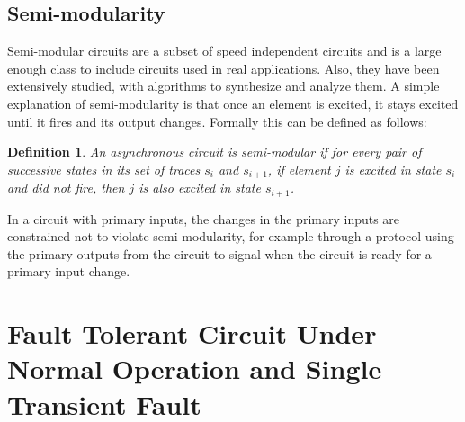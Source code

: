\documentclass[12pt]{report}
\newtheorem*{definition}{Definition}
\begin{document}
\section{Semi-modularity}
Semi-modular circuits are a subset of speed independent circuits and is a large enough class to include circuits used in real applications.  Also, they have been extensively studied, with algorithms to synthesize and analyze them.  A simple explanation of semi-modularity is that once an element is excited, it stays excited until it fires and its output changes.  Formally this can be defined as follows: %
\begin{definition}
An asynchronous circuit is {\em semi-modular} if for every pair of successive states in its set of traces $s_{i}$ and $s_{i+1}$, if element $j$ is excited in state $s_i$ and did not fire, then $j$ is also excited in state $s_{i+1}$. 
\end{definition}
In a circuit with primary inputs, the changes in the primary inputs are constrained not to violate semi-modularity, for example through a protocol using the primary outputs from the circuit to signal when the circuit is ready for a primary input change.


\chapter{Fault Tolerant Circuit Under Normal Operation and Single Transient Fault}
\end{document}
